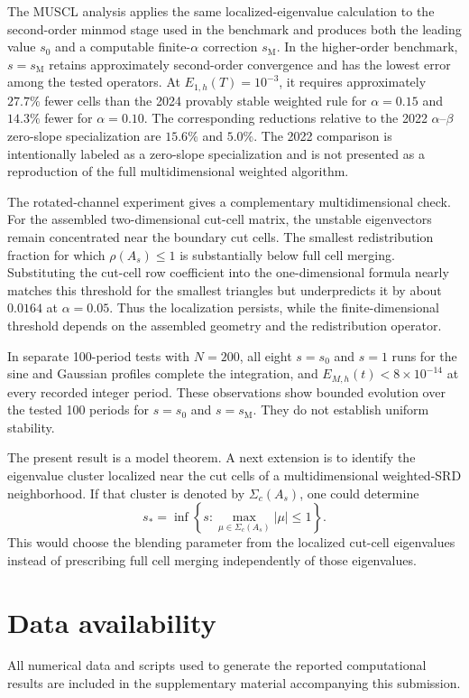 \documentclass[preprint,12pt]{elsarticle}
\begin{document}
The MUSCL analysis applies the same localized-eigenvalue calculation to the
second-order minmod stage used in the benchmark and produces both the leading
value $s_0$ and a computable
finite-$\alpha$ correction $s_{\mathrm M}$.  In the higher-order benchmark,
$s=s_{\mathrm M}$ retains approximately second-order convergence and has the
lowest error among the tested operators.  At $E_{1,h}(T)=10^{-3}$, it
requires approximately $27.7\%$ fewer cells than the 2024 provably stable
weighted rule for $\alpha=0.15$ and $14.3\%$ fewer for $\alpha=0.10$.
The corresponding reductions relative to the 2022 $\alpha$--$\beta$
zero-slope specialization are $15.6\%$ and $5.0\%$.  The 2022 comparison is
intentionally labeled as a zero-slope specialization and is not presented as
a reproduction of the full multidimensional weighted algorithm.

The rotated-channel experiment gives a complementary multidimensional check.
For the assembled two-dimensional cut-cell matrix, the unstable eigenvectors
remain concentrated near the boundary cut cells.  The smallest redistribution
fraction for which $\rho(A_s)\le1$ is substantially below full cell merging.
Substituting the cut-cell row coefficient into the one-dimensional formula
nearly matches this threshold for the smallest triangles but underpredicts it
by about $0.0164$ at $\alpha=0.05$.  Thus the localization persists, while the
finite-dimensional threshold depends on the assembled geometry and the
redistribution operator.

In separate 100-period tests with $N=200$, all eight $s=s_0$ and $s=1$
runs for the sine and Gaussian profiles complete the integration, and
$E_{M,h}(t)<8\times10^{-14}$ at every recorded integer period.  These observations show bounded evolution over the tested 100 periods for
$s=s_0$ and $s=s_{\mathrm M}$.  They do not establish uniform stability.

The present result is a model theorem.  A next extension is to identify the
eigenvalue cluster localized near the cut cells of a multidimensional
weighted-SRD neighborhood.  If that cluster is denoted by $\Sigma_c(A_s)$,
one could determine
\[
    s_*=\inf\left\{s:
    \max_{\mu\in\Sigma_c(A_s)}|\mu|\le1\right\}.
\]
This would choose the blending parameter from the localized cut-cell
eigenvalues instead of prescribing full cell merging independently of those
eigenvalues.


\section*{Data availability}
All numerical data and scripts used to generate the reported computational
results are included in the supplementary material accompanying this
submission.
\end{document}
